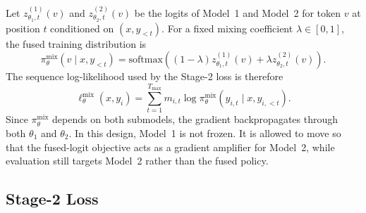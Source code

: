 Let $z^{(1)}_{\theta_1,t}(v)$ and $z^{(2)}_{\theta_2,t}(v)$ be the logits of
Model~1 and Model~2 for token $v$ at position $t$ conditioned on
$(x,y_{<t})$. For a fixed mixing coefficient $\lambda\in[0,1]$, the fused
training distribution is
\begin{equation}
    \pi_{\theta}^{\mathrm{mix}}(v\mid x,y_{<t})
    =
    \mathrm{softmax}\!\left(
        (1-\lambda)z^{(1)}_{\theta_1,t}(v)
        +
        \lambda z^{(2)}_{\theta_2,t}(v)
    \right).
    \label{eq:stage2-fused-policy}
\end{equation}
The sequence log-likelihood used by the Stage-2 loss is therefore
\begin{equation}
    \ell_{\theta}^{\mathrm{mix}}(x,y_i)
    =
    \sum_{t=1}^{T_{\max}}
    m_{i,t}
    \log
    \pi_{\theta}^{\mathrm{mix}}(y_{i,t}\mid x,y_{i,<t}).
    \label{eq:stage2-fused-loglik}
\end{equation}
Since $\pi_{\theta}^{\mathrm{mix}}$ depends on both submodels, the gradient
backpropagates through both $\theta_1$ and $\theta_2$. In this design, Model~1
is not frozen. It is allowed to move so that the fused-logit objective acts as
a gradient amplifier for Model~2, while evaluation still targets Model~2
rather than the fused policy.

\subsection{Stage-2 Loss}
\label{sec:stage2-loss}

